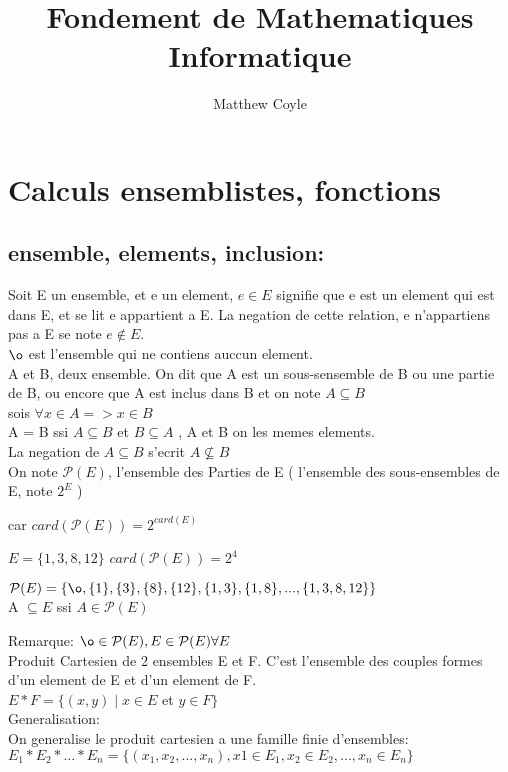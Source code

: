 \documentclass{article}
\author{Matthew Coyle}
\title{Fondement de Mathematiques Informatique}
\begin{document}
\maketitle


\section{Calculs ensemblistes, fonctions}

\subsection{ensemble, elements, inclusion:}


Soit E un ensemble, et e un element, $e \in E$ signifie que e est un element qui est dans E, et se lit e appartient a E.
La negation de cette relation, e n'appartiens pas a E se note $e \notin E$.\\
$\o$ est l'ensemble qui ne contiens auccun element.\\

A et B, deux ensemble. On dit que A est un sous-sensemble de B ou une partie de B, ou encore que A est inclus dans B et on note $A \subseteq B$\\
sois $\forall x \in A => x \in B$\\

A = B ssi $A \subseteq B$ et $B \subseteq A$ , A et B on les memes elements.\\
La negation de $A \subseteq B$ s'ecrit $A \not\subseteq B$\\

On note $\mathcal{P}(E)$, l'ensemble des Parties de E ( l'ensemble des sous-ensembles de E, note $2^E$ )

car $card(\mathcal{P}(E)) = 2^{card(E)}$

$E = \{1,3,8,12\}$ $card(\mathcal{P}(E))=2^4$

$\mathcal{P}(E)=\{\o,\{1\},\{3\},\{8\},\{12\},\{1,3\},\{1,8\}, ... , \{1,3,8,12\}\}$\\

A $\subseteq E$ ssi $A \in \mathcal{P}(E)$


Remarque: 
	$\o \in \mathcal{P}(E), E \in \mathcal{P}(E) \forall E$\\


Produit Cartesien de 2 ensembles E et F. C'est l'ensemble des couples formes d'un element de E et d'un element de F.\\
	$E*F = \{(x,y) \mid x \in E$ et $y \in F\}$\\
\clearpage
Generalisation:\\
On generalise le produit cartesien a une famille finie d'ensembles:\\
$E_1 * E_2 * ... * E_n = \{(x_1,x_2,...,x_n), x1 \in E_1, x_2 \in E_2, ... , x_n \in E_n\}$
\end{document}
